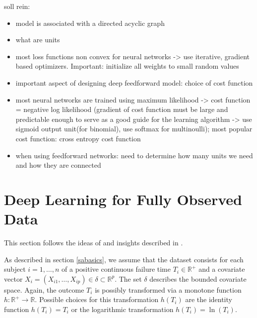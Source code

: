 \documentclass[12pt, a4paper]{article}
\theoremstyle{definition}
\theoremstyle{plain}
\numberwithin{equation}{section}
\numberwithin{figure}{section}
\numberwithin{table}{section}
\begin{document}
	
	
	soll rein:
	\begin{itemize}
		\item model is associated with a directed acyclic graph
		\item what are units
		\item most loss functions non convex for neural networks -> use iterative, gradient based optimizers. Important: initialize all weights to small random values
		\item important aspect of designing deep feedforward model: choice of cost function
		\item most neural networks are trained using maximum likelihood -> cost function = negative log likelihood (gradient of cost function must be large and predictable enough to serve as a good guide for the learning algorithm -> use sigmoid output unit(for binomial), use softmax for multinoulli); most popular cost function: cross entropy cost function
		\item when using feedforward networks: need to determine how many units we need and how they are connected
	\end{itemize}
	
	
	
	\newpage
%	
%	
	
	
	\section{Deep Learning for Fully Observed Data} \label{uncensored}
	This section follows the ideas of \citet*{basearticle} and insights described in \citet*{deeplbook}.
	
	As described in section \ref{sabasics}, we assume that the dataset consists for each subject $i = 1,\dots,n$ of a positive continuous failure time $T_i \in \mathbb{R}^+$ and a covariate vector $X_i = (X_{i1}, \dots , X_{ip}) \in \delta \subset \mathbb{R}^p$.
	The set $\delta$ describes the bounded covariate space.
	Again, the outcome $T_i$ is possibly transformed via a monotone function $h: \mathbb{R}^+ \rightarrow \mathbb{R}$.
	Possible choices for this transformation $h(T_i)$ are the identity function $h(T_i)=T_i$ or the logarithmic transformation $h(T_i)= \ln (T_i)$.
	
\end{document}
